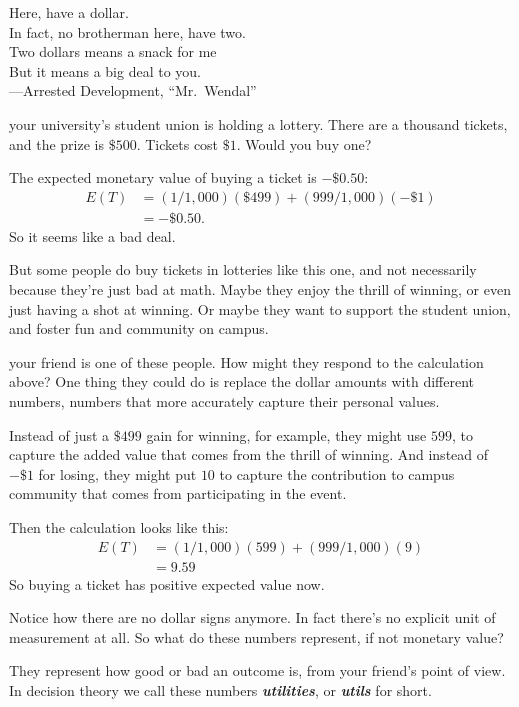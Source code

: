 \documentclass[justified]{tufte-book}
\newcommand{\E}{E}
\newenvironment{epigraph}%
{
\begin{flushright}    
\begin{minipage}{20em}
\begin{flushright}
\itshape
}%
{
\end{flushright}
\end{minipage}
\end{flushright}
}
\theoremstyle{definition}
\theoremstyle{definition}
\theoremstyle{definition}
\theoremstyle{remark}
\begin{document}
\begin{epigraph}
Here, have a dollar.\\
In fact, no brotherman here, have two.\\
Two dollars means a snack for me\\
But it means a big deal to you.\\
---Arrested Development, ``Mr.~Wendal''
\end{epigraph}

 your university's student union is holding a
lottery. There are a thousand tickets, and the prize is \(\$500\).
Tickets cost \(\$1\). Would you buy one?

The expected monetary value of buying a ticket is \(-\$0.50\): \[
  \begin{aligned}
    \E(T) &= (1/1,000)(\$499) + (999/1,000)(-\$1)\\
          &= -\$0.50.
  \end{aligned}
\] So it seems like a bad deal.

But some people do buy tickets in lotteries like this one, and not
necessarily because they're just bad at math. Maybe they enjoy the
thrill of winning, or even just having a shot at winning. Or maybe they
want to support the student union, and foster fun and community on
campus.

 your friend is one of these people. How might they
respond to the calculation above? One thing they could do is replace the
dollar amounts with different numbers, numbers that more accurately
capture their personal values.

Instead of just a \(\$499\) gain for winning, for example, they might
use \(599\), to capture the added value that comes from the thrill of
winning. And instead of \(-\$1\) for losing, they might put \(10\) to
capture the contribution to campus community that comes from
participating in the event.

Then the calculation looks like this: \[
  \begin{aligned}
    \E(T) &= (1/1,000)(599) + (999/1,000)(9)\\
          &= 9.59
  \end{aligned}
\] So buying a ticket has positive expected value now.

Notice how there are no dollar signs anymore. In fact there's no
explicit unit of measurement at all. So what do these numbers represent,
if not monetary value?

They represent how good or bad an outcome is, from your friend's point
of view. In decision theory we call these numbers
\textbf{\emph{utilities}}, or \textbf{\emph{utils}} for short.
\end{document}
